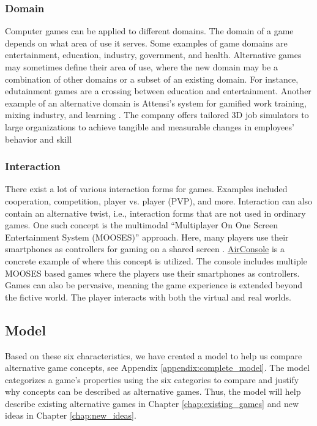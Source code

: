 \subsubsection{Domain}
Computer games can be applied to different domains. The domain of a game depends on what area of use it serves. Some examples of game domains are entertainment, education, industry, government, and health. Alternative games may sometimes define their area of use, where the new domain may be a combination of other domains or a subset of an existing domain. For instance, edutainment games are a crossing between education and entertainment. Another example of an alternative domain is Attensi’s system for gamified work training, mixing industry, and learning \citep{attensi_why_2020}. The company offers tailored 3D job simulators to large organizations to achieve tangible and measurable changes in employees’ behavior and skill

\subsubsection{Interaction}
There exist a lot of various interaction forms for games. Examples included cooperation, competition, player vs. player (PVP), and more. Interaction can also contain an alternative twist, i.e., interaction forms that are not used in ordinary games. One such concept is the multimodal “Multiplayer On One Screen Entertainment System (MOOSES)” approach. Here, many players use their smartphones as controllers for gaming on a shared screen \citep{wang_evaluation_2010}. \href{http://www.airconsole.com}{AirConsole} is a concrete example of where this concept is utilized. The console includes multiple MOOSES based games where the players use their smartphones as controllers. Games can also be pervasive, meaning the game experience is extended beyond the fictive world. The player interacts with both the virtual and real worlds.

\subsection{Model}
Based on these six characteristics, we have created a model to help us compare alternative game concepts, see Appendix \ref{appendix:complete_model}. The model categorizes a game’s properties using the six categories to compare and justify why concepts can be described as alternative games. Thus, the model will help describe existing alternative games in Chapter \ref{chap:existing_games} and new ideas in Chapter \ref{chap:new_ideas}.

